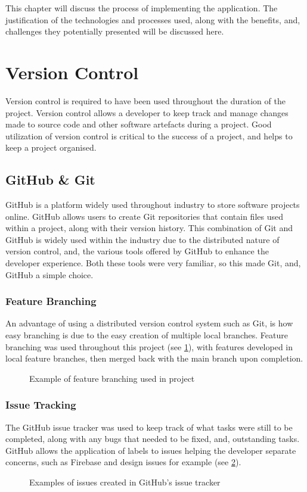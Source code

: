 This chapter will discuss the process of implementing the application. The justification of the technologies and processes used, along with the benefits, and, challenges they potentially presented will be discussed here.

\section{Version Control}
Version control is required to have been used throughout the duration of the project. Version control allows a developer to keep track and manage changes made to source code and other software artefacts during a project. Good utilization of version control is critical to the success of a project, and helps to keep a project organised.
\subsection{GitHub \& Git}
GitHub \cite{github} is a platform widely used throughout industry to store software projects online. GitHub allows users to create Git repositories \cite{git} that contain files used within a project, along with their version history. This combination of Git and GitHub is widely used within the industry due to the distributed nature of version control, and, the various tools offered by GitHub to enhance the developer experience. Both these tools were very familiar, so this made Git, and, GitHub a simple choice. 
\subsubsection{Feature Branching}
An advantage of using a distributed version control system such as Git, is how easy branching is due to the easy creation of multiple local branches. Feature branching was used throughout this project (see \ref{fig:branching}), with features developed in local feature branches, then merged back with the main branch upon completion.  
\begin{figure}[!htbp]
    \centering
    \begin{subfigure}[b]{0.90\textwidth}
    \end{subfigure}
    \caption{Example of feature branching used in project}
    \label{fig:branching}
\end{figure}
\subsubsection{Issue Tracking}
The GitHub issue tracker was used to keep track of what tasks were still to be completed, along with any bugs that needed to be fixed, and, outstanding tasks. GitHub allows the application of labels to issues helping the developer separate concerns, such as Firebase and design issues for example (see \ref{fig:issues}).
\begin{figure}[!htbp]
    \centering
    \begin{subfigure}[b]{0.90\textwidth}
    \end{subfigure}
    \caption{Examples of issues created in GitHub's issue tracker}
    \label{fig:issues}
\end{figure}
